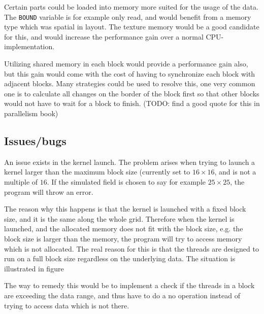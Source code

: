 Certain parts could be loaded into memory more suited for the usage of the data. The \texttt{BOUND} variable is for example only read, and would benefit from a memory type which was spatial in layout. The texture memory would be a good candidate for this, and would increase the performance gain over a normal CPU-implementation.

Utilizing shared memory in each block would provide a performance gain also, but this gain would come with the cost of having to synchronize each block with adjacent blocks. Many strategies could be used to resolve this, one very common one is to calculate all changes on the border of the block first so that other blocks would not have to wait for a block to finish. (TODO: find a good quote for this in parallelism book)



\subsection{Issues/bugs}
An issue exists in the kernel launch. The problem arises when trying to launch a kernel larger than the maximum block size (currently set to $16\times16$, and is not a multiple of $16$. If the simulated field is chosen to say for example $25\times25$, the program will throw an error.

The reason why this happens is that the kernel is launched with a fixed block size, and it is the same along the whole grid. Therefore when the kernel is launched, and the allocated memory does not fit with the block size, e.g. the block size is larger than the memory, the program will try to access memory which is not allocated. The real reason for this is that the threads are designed to run on a full block size regardless on the underlying data. The situation is illustrated in figure 


The way to remedy this would be to implement a check if the threads in a block are exceeding the data range, and thus have to do a no operation instead of trying to access data which is not there.